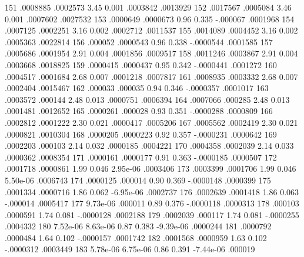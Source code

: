         151  {\VBAR}   .0008885   .0002573     3.45   0.001     .0003842    .0013929
        152  {\VBAR}   .0017567   .0005084     3.46   0.001     .0007602    .0027532
        153  {\VBAR}   .0000649   .0000673     0.96   0.335     -.000067    .0001968
        154  {\VBAR}   .0007125   .0002251     3.16   0.002     .0002712    .0011537
        155  {\VBAR}   .0014089   .0004452     3.16   0.002     .0005363    .0022814
        156  {\VBAR}    .000052   .0000543     0.96   0.338    -.0000544    .0001585
        157  {\VBAR}   .0005686   .0001954     2.91   0.004     .0001856    .0009517
        158  {\VBAR}   .0011246   .0003867     2.91   0.004     .0003668    .0018825
        159  {\VBAR}   .0000415   .0000437     0.95   0.342    -.0000441    .0001272
        160  {\VBAR}   .0004517   .0001684     2.68   0.007     .0001218    .0007817
        161  {\VBAR}   .0008935   .0003332     2.68   0.007     .0002404    .0015467
        162  {\VBAR}    .000033    .000035     0.94   0.346    -.0000357    .0001017
        163  {\VBAR}   .0003572    .000144     2.48   0.013     .0000751    .0006394
        164  {\VBAR}   .0007066    .000285     2.48   0.013     .0001481    .0012652
        165  {\VBAR}   .0000261    .000028     0.93   0.351    -.0000288    .0000809
        166  {\VBAR}   .0002812   .0001222     2.30   0.021     .0000417    .0005206
        167  {\VBAR}   .0005562   .0002419     2.30   0.021     .0000821    .0010304
        168  {\VBAR}   .0000205   .0000223     0.92   0.357    -.0000231    .0000642
        169  {\VBAR}   .0002203    .000103     2.14   0.032     .0000185    .0004221
        170  {\VBAR}   .0004358   .0002039     2.14   0.033     .0000362    .0008354
        171  {\VBAR}   .0000161   .0000177     0.91   0.363    -.0000185    .0000507
        172  {\VBAR}   .0001718   .0000861     1.99   0.046     2.95e-06    .0003406
        173  {\VBAR}   .0003399   .0001706     1.99   0.046     5.50e-06    .0006743
        174  {\VBAR}   .0000125    .000014     0.90   0.369    -.0000148    .0000399
        175  {\VBAR}   .0001334   .0000716     1.86   0.062    -6.95e-06    .0002737
        176  {\VBAR}   .0002639   .0001418     1.86   0.063     -.000014    .0005417
        177  {\VBAR}   9.73e-06    .000011     0.89   0.376    -.0000118    .0000313
        178  {\VBAR}    .000103   .0000591     1.74   0.081    -.0000128    .0002188
        179  {\VBAR}   .0002039    .000117     1.74   0.081    -.0000255    .0004332
        180  {\VBAR}   7.52e-06   8.63e-06     0.87   0.383    -9.39e-06    .0000244
        181  {\VBAR}   .0000792   .0000484     1.64   0.102    -.0000157    .0001742
        182  {\VBAR}   .0001568   .0000959     1.63   0.102    -.0000312    .0003449
        183  {\VBAR}   5.78e-06   6.75e-06     0.86   0.391    -7.44e-06     .000019
{\smallskip}
